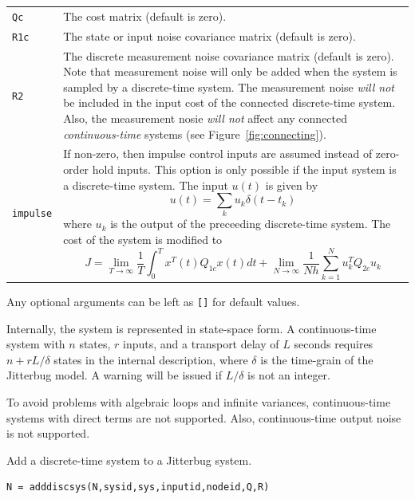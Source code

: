 \documentclass[final,twoside]{rapport}  %
\begin{document}
\optargs
\begin{tabularx}{\hsize}{l>{\raggedright\arraybackslash}X}
{\tt Qc} & The cost matrix (default is zero).
\\
{\tt R1c} & The state or input noise covariance matrix (default is
zero).
\\
{\tt R2} & The discrete measurement noise covariance matrix (default is zero). 
Note that measurement noise will only be added when the system is
sampled by a discrete-time system. The measurement noise {\em will
  not} be included in the input cost of the connected discrete-time
system. Also, the measurement nosie {\em will  not} affect any connected
{\em  continuous-time} systems (see Figure~\ref{fig:connecting}).\\
{\tt impulse} & If non-zero, then impulse control inputs are assumed instead of
zero-order hold inputs. This option is only possible if the input system is a
discrete-time system. The input $u(t)$ is given by
\[
u(t) = \sum_{k} u_k \delta(t-t_k)
\]
where $u_k$ is the output of the preceeding discrete-time system.
The cost of the system is modified to
\[
J = \lim_{T \rightarrow \infty} \frac{1}{T} \int_0^T
  x^T(t) Q_{1c} x(t)
     dt + \lim_{N\to\infty}\frac{1}{Nh} \sum_{k=1}^N u^T_k Q_{2c} u_k
\]
\end{tabularx}

Any optional arguments can be left as {\tt []} for default values.

\remark
Internally, the system is represented in state-space
form. A continuous-time system with $n$ states, $r$ inputs, and a
transport delay of $L$ seconds requires $n + rL/\delta$ states in the
internal description, where $\delta$ is the time-grain of the {\sc
  Jitterbug} model. A warning will be issued if $L/\delta$ is not an
integer.

\limitations
To avoid problems with algebraic loops and infinite variances, 
continuous-time systems with direct terms are not supported. Also,
continuous-time output noise is not supported.



\label{sec:adddiscsys}

\purpose
 Add a discrete-time system to a {\sc Jitterbug} system.

\syntax
\begin{verbatim}
N = adddiscsys(N,sysid,sys,inputid,nodeid,Q,R)
\end{verbatim}
\end{document}
